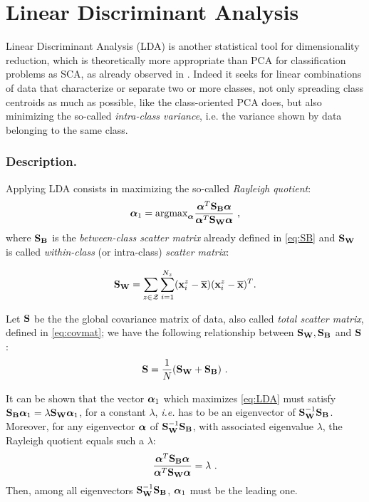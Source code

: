 \section{Linear Discriminant Analysis}\label{sec:LDA}

Linear Discriminant Analysis (LDA) \cite{Fukunaga} is another statistical tool for dimensionality reduction, which is theoretically more appropriate than PCA for classification problems as SCA, as already observed in \cite{lessIsMore,Standaert2008}. Indeed it seeks for linear combinations of data that characterize or separate two or more classes, not only spreading class centroids as much as possible, like the class-oriented PCA does, but also minimizing the so-called {\em intra-class variance}, i.e. the variance shown by data belonging to the same class.\\

\subsubsection{Description.} Applying LDA consists in maximizing the so-called {\em Rayleigh quotient}:
 \begin{equation}\label{eq:LDA}
 \AAlpha_1=\mathrm{argmax}_{\AAlpha} \frac{\AAlpha^T \SB \AAlpha}{\AAlpha^T \SW \AAlpha} \mbox{ ,}
 \end{equation}
where $\SB$ is the {\em between-class scatter matrix} already defined in \eqref{eq:SB} and $\SW$ is called 
{\em within-class} (or intra-class) {\em scatter matrix}:

\begin{equation}
\SW = \sum_{\sensVar\in\sensVarSet}\sum_{i=1}^{\numTraces}(\sss{i}-\mmmX)(\sss{i}-\mmmX)^T \mbox{.}
\end{equation}


\begin{remark}
Let $\covmat$ be the the global covariance matrix of data, also called {\em total scatter matrix}, defined in \eqref{eq:covmat}; we have the following relationship between $\SW,\SB$ and $\covmat$:
\begin{equation}
\covmat = \frac{1}{\numTraces[]}(\SW + \SB) \mbox{ .}
\end{equation}
\end{remark}

It can be shown that the vector $\AAlpha_1$ which maximizes \eqref{eq:LDA} must satisfy $\SB\AAlpha_1 = \lambda \SW \AAlpha_1$, for a constant $\lambda$, \textit{i.e.} has to be an eigenvector of $\SW^{-1} \SB$. Moreover, for any eigenvector $\AAlpha$ of $\SW^{-1}\SB$, with associated eigenvalue $\lambda$, the Rayleigh quotient equals such a $\lambda$:
\begin{equation}\label{eq:lambdas}
\frac{\AAlpha^T \SB \AAlpha}{\AAlpha^T \SW \AAlpha} = \lambda \mbox{ .}
\end{equation}
Then, among all eigenvectors $\SW^{-1} \SB$, $\AAlpha_1$ must be the leading one.\\


